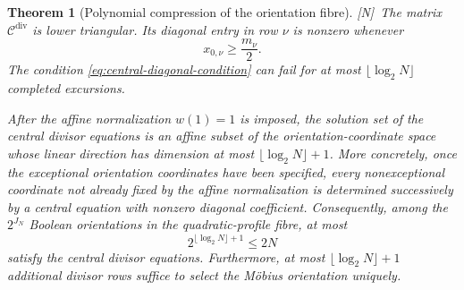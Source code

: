 \documentclass[11pt,reqno]{amsart}
\numberwithin{equation}{section}
\theoremstyle{plain}
\newtheorem{theorem}{Theorem}[section]
\theoremstyle{definition}
\theoremstyle{remark}
\newcommand{\tagN}{\textup{[N]}}
\begin{document}
\begin{theorem}[Polynomial compression of the orientation fibre]
\label{thm:polynomial-orientation-compression}
\tagN\ The matrix $\mathscr C^{\mathrm{div}}$ is lower triangular.  Its
diagonal entry in row $\nu$ is nonzero whenever
\begin{equation}
x_{0,\nu}\ge \frac{m_\nu}{2}.
\label{eq:central-diagonal-condition}
\end{equation}
The condition \eqref{eq:central-diagonal-condition} can fail for at most
$\lfloor\log_2N\rfloor$ completed excursions.

After the affine normalization $w(1)=1$ is imposed, the solution set of the
central divisor equations is an affine subset of the orientation-coordinate
space whose linear direction has dimension at most
$\lfloor\log_2N\rfloor+1$.  More concretely, once the exceptional orientation
coordinates have been specified, every nonexceptional coordinate not already
fixed by the affine normalization is determined successively by a central
equation with nonzero diagonal coefficient.  Consequently, among the
$2^{J_N}$ Boolean orientations in the quadratic-profile fibre, at most
\begin{equation}
2^{\lfloor\log_2N\rfloor+1}\le2N
\label{eq:polynomial-survivors}
\end{equation}
satisfy the central divisor equations.  Furthermore, at most
$\lfloor\log_2N\rfloor+1$ additional divisor rows suffice to select the
M\"obius orientation uniquely.
\end{theorem}
\end{document}

